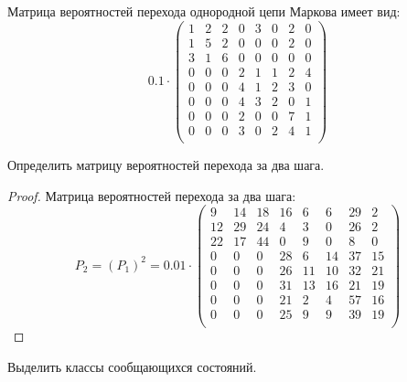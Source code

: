 
\renewcommand*{\proofname}{Решение}

Матрица вероятностей перехода однородной цепи Маркова имеет вид:
\[
	0.1 \cdot
	\begin{pmatrix}
		1 & 2 & 2 & 0 & 3 & 0 & 2 & 0\\
		1 & 5 & 2 & 0 & 0 & 0 & 2 & 0\\
		3 & 1 & 6 & 0 & 0 & 0 & 0 & 0\\
		0 & 0 & 0 & 2 & 1 & 1 & 2 & 4\\
		0 & 0 & 0 & 4 & 1 & 2 & 3 & 0\\
		0 & 0 & 0 & 4 & 3 & 2 & 0 & 1\\
		0 & 0 & 0 & 2 & 0 & 0 & 7 & 1\\
		0 & 0 & 0 & 3 & 0 & 2 & 4 & 1\\
	\end{pmatrix}
\]

\begin{problem}
	Определить матрицу вероятностей перехода за два шага.
\end{problem}

\begin{proof}
	Матрица вероятностей перехода за два шага:
	\[
		P_2 = (P_1)^2 = 0.01 \cdot
		\begin{pmatrix}
			9 & 14 & 18 & 16 & 6 & 6 & 29 & 2\\
			12 & 29 & 24 & 4 & 3 & 0 & 26 & 2\\
			22 & 17 & 44 & 0 & 9 & 0 & 8 & 0\\
			0 & 0 & 0 & 28 & 6 & 14 & 37 & 15\\
			0 & 0 & 0 & 26 & 11 & 10 & 32 & 21\\
			0 & 0 & 0 & 31 & 13 & 16 & 21 & 19\\
			0 & 0 & 0 & 21 & 2 & 4 & 57 & 16\\
			0 & 0 & 0 & 25 & 9 & 9 & 39 & 19\\
		\end{pmatrix}
	\]
\end{proof}

\begin{problem}
	Выделить классы сообщающихся состояний.
\end{problem}

